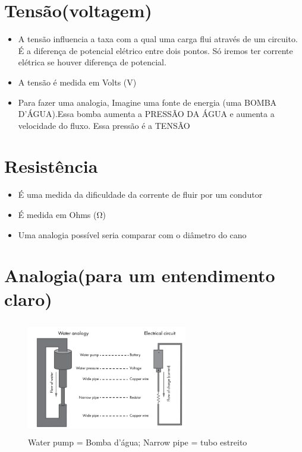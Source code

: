 \documentclass{report}
\begin{document}
	\section{Tensão(voltagem)}
	\begin{itemize}
		\item A tensão influencia a taxa com a qual uma carga flui através de um circuito. É a diferença de potencial elétrico entre dois pontos. Só iremos ter corrente elétrica se houver diferença de potencial.
		\item A tensão é medida em Volts (V)
		\item Para fazer uma analogia, Imagine uma fonte de energia (uma BOMBA D’ÁGUA).Essa bomba aumenta a PRESSÃO DA ÁGUA e aumenta a
		velocidade do fluxo. Essa pressão é a TENSÃO
	\end{itemize}
	\section{Resistência}
	\begin{itemize}
		\item É uma medida da dificuldade da corrente de fluir por um condutor
		\item É medida em Ohms (Ω)
		\item Uma analogia possível seria comparar com o diâmetro do cano
	\end{itemize}
	\section{Analogia(para um entendimento claro)}
	\begin{figure}[ht]
		\centering
		\includegraphics[width=7cm,height=5cm,keepaspectratio=false]{imagens/analogia.png}
		\caption{Water pump = Bomba d'água; Narrow pipe = tubo estreito}
	\end{figure}
\end{document}

